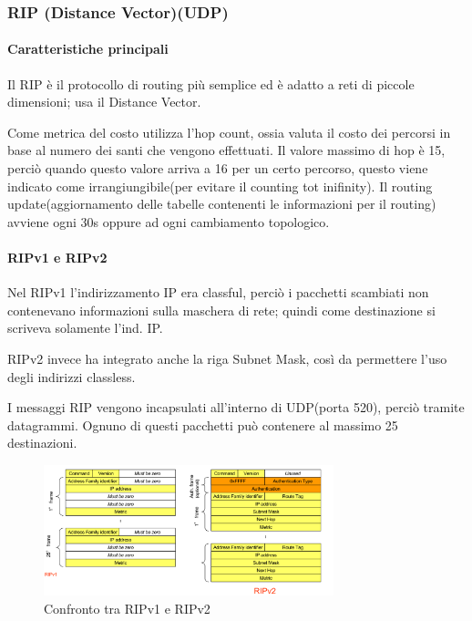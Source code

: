 \subsubsection{RIP (Distance Vector)(UDP)}
\paragraph{Caratteristiche principali}
Il RIP è il protocollo di routing più semplice ed è adatto a reti di piccole dimensioni; usa il Distance Vector.

Come metrica del costo utilizza l'hop count, ossia valuta il costo dei percorsi in base al numero dei santi che vengono effettuati.
Il valore massimo di hop è 15, perciò quando questo valore arriva a 16 per un certo percorso, questo viene indicato come irrangiungibile(per evitare il counting tot inifinity).
Il routing update(aggiornamento delle tabelle contenenti le informazioni per il routing) avviene ogni 30s oppure ad ogni cambiamento topologico.

\paragraph{RIPv1 e RIPv2}

 Nel RIPv1 l'indirizzamento IP era classful, perciò i pacchetti scambiati non contenevano informazioni sulla maschera di rete; quindi come destinazione si scriveva solamente l'ind. IP.

 RIPv2 invece ha integrato anche la riga Subnet Mask, così da permettere l'uso degli indirizzi classless. 

 I messaggi RIP vengono incapsulati all'interno di UDP(porta 520), perciò tramite datagrammi. Ognuno di questi pacchetti può contenere al massimo 25 destinazioni.

\begin{figure}[h!]
    \centering
    \includegraphics[width=0.75\textwidth]{images/RIPversioni.png}
    \caption{Confronto tra RIPv1 e RIPv2}
    \label{fig:ripversioni}
\end{figure}


